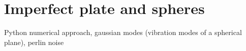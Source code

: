 \section{Imperfect plate and spheres}
\label{sec:3:imperfect-plates}

Python numerical approach, gaussian modes (vibration modes of a spherical plane), perlin noise